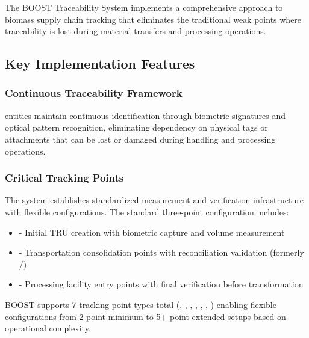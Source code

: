 
The BOOST Traceability System implements a comprehensive approach to biomass supply chain tracking that eliminates the traditional weak points where traceability is lost during material transfers and processing operations.

\subsection{Key Implementation Features}
\label{sec:key-implementation-features}

\subsubsection{Continuous Traceability Framework}
\label{sec:traceability-continuous-framework}

\begin{important}[title=Comprehensive Traceability Approach]
\TRU{} entities maintain continuous identification through biometric signatures and optical pattern recognition, eliminating dependency on physical tags or attachments that can be lost or damaged during handling and processing operations.
\end{important}

\subsubsection{Critical Tracking Points}
\label{sec:critical-tracking-points}

The system establishes standardized measurement and verification infrastructure with flexible configurations. The standard three-point configuration includes:

\begin{itemize}
    \item \textbf{} - Initial TRU creation with biometric capture and volume measurement
    \item \textbf{} - Transportation consolidation points with reconciliation validation (formerly /)
    \item \textbf{} - Processing facility entry points with final verification before transformation
\end{itemize}

BOOST supports 7 tracking point types total (, , , , , , ) enabling flexible configurations from 2-point minimum to 5+ point extended setups based on operational complexity.


